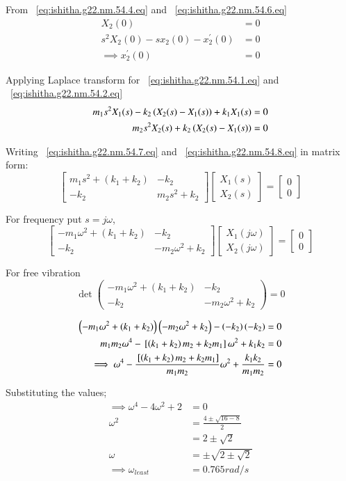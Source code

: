 \documentclass[journal,12pt,twocolumn]{IEEEtran}
\theoremstyle{remark}
\begin{document}
From ~\eqref{eq:ishitha.g22.nm.54.4.eq} and ~\eqref{eq:ishitha.g22.nm.54.6.eq}
\begin{align}
X_2(0)&=0\\
s^{2}X_2(0)-sx_2(0)-x_2^{'}(0)&=0\\
\implies x_2^{'}(0)&=0
\end{align}

Applying Laplace transform for ~\eqref{eq:ishitha.g22.nm.54.1.eq} and ~\eqref{eq:ishitha.g22.nm.54.2.eq}
\begin{align}
m_1s^2X_1(s) - k_2\left(X_2(s)-X_1(s)\right) + k_1X_1(s) &= 0
\label{eq:ishitha.g22.nm.54.7.eq} \\
m_2s^2X_2(s) + k_2\left(X_2(s)-X_1(s)\right)&=0
\label{eq:ishitha.g22.nm.54.8.eq} 
\end{align}

Writing ~\eqref{eq:ishitha.g22.nm.54.7.eq} and ~\eqref{eq:ishitha.g22.nm.54.8.eq} in matrix form:
\[
\begin{bmatrix}
m_1s^2+(k_1+k_2) & -k_2  \\
-k_2& m_2s^2+k_2
\end{bmatrix}
\begin{bmatrix}
X_1(s) \\
X_2(s)
\end{bmatrix}
=
\begin{bmatrix}
0 \\
0
\end{bmatrix}
\]

For frequency put $s=j\omega$,
\[
\begin{bmatrix}
-m_1\omega ^2+(k_1+k_2) & -k_2  \\
-k_2& -m_2\omega ^2+k_2
\end{bmatrix}
\begin{bmatrix}
X_1(j\omega) \\
X_2(j\omega)
\end{bmatrix}
=
\begin{bmatrix}
0 \\
0
\end{bmatrix}
\]

For free vibration 
\[
\det
\begin{pmatrix}
-m_1\omega^2+(k_1+k_2) & -k_2 \\
-k_2 & -m_2\omega^2+k_2
\end{pmatrix}
= 0
\]

\begin{align}
\left(-m_1\omega^2+(k_1+k_2)\right)\left(-m_2\omega^2+k_2\right)-\left(-k_2\right)\left(-k_2\right)&=0 \\
m_1m_2\omega ^4 -{}\left[\left(k_1+k_2\right)m_2+k_2m_1\right]\omega^2 +k_1k_2&=0\\
\implies \omega ^4 -\frac{{}\left[\left(k_1+k_2\right)m_2+k_2m_1\right]}{m_1m_2}\omega^2 +\frac{k_1k_2}{m_1m_2}&=0
\end{align}

Substituting the values;
\begin{align}
\implies \omega ^4 -4\omega^2 +2&=0 \\
\omega ^2 &= \frac{4\pm \sqrt{16-8}}{2}\\
&= 2\pm \sqrt{2}\\
 \omega &= \pm \sqrt{2\pm \sqrt{2}}\\
\implies \omega_{least} &= 0.765 rad/s
\end{align}
\end{document}
